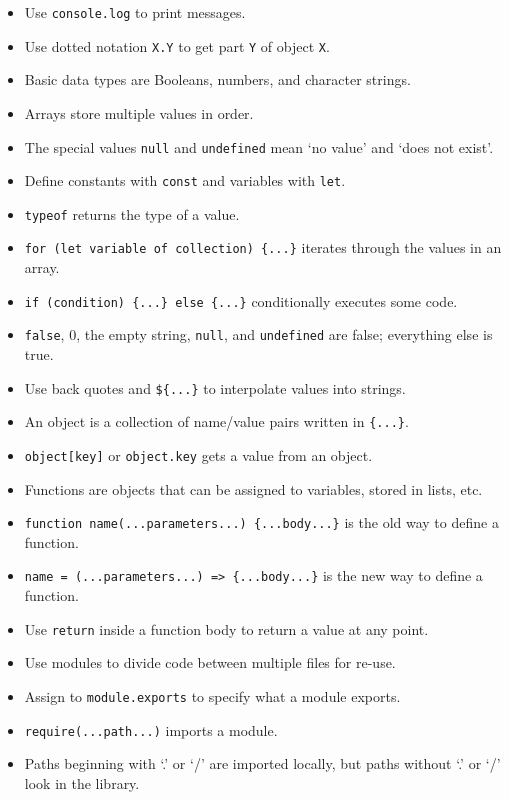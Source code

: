 \begin{itemize}
\item
  Use \texttt{console.log} to print messages.
\item
  Use dotted notation \texttt{X.Y} to get part \texttt{Y} of object \texttt{X}.
\item
  Basic data types are Booleans, numbers, and character strings.
\item
  Arrays store multiple values in order.
\item
  The special values \texttt{null} and \texttt{undefined} mean `no value' and `does not exist'.
\item
  Define constants with \texttt{const} and variables with \texttt{let}.
\item
  \texttt{typeof} returns the type of a value.
\item
  \texttt{for\ (let\ variable\ of\ collection)\ \{...\}} iterates through the values in an array.
\item
  \texttt{if\ (condition)\ \{...\}\ else\ \{...\}} conditionally executes some code.
\item
  \texttt{false}, 0, the empty string, \texttt{null}, and \texttt{undefined} are false; everything else is true.
\item
  Use back quotes and \texttt{\$\{...\}} to interpolate values into strings.
\item
  An object is a collection of name/value pairs written in \texttt{\{...\}}.
\item
  \texttt{object{[}key{]}} or \texttt{object.key} gets a value from an object.
\item
  Functions are objects that can be assigned to variables, stored in lists, etc.
\item
  \texttt{function\ name(...parameters...)\ \{...body...\}} is the old way to define a function.
\item
  \texttt{name\ =\ (...parameters...)\ =\textgreater{}\ \{...body...\}} is the new way to define a function.
\item
  Use \texttt{return} inside a function body to return a value at any point.
\item
  Use modules to divide code between multiple files for re-use.
\item
  Assign to \texttt{module.exports} to specify what a module exports.
\item
  \texttt{require(...path...)} imports a module.
\item
  Paths beginning with `.' or `/' are imported locally, but paths without `.' or `/' look in the library.
\end{itemize}
